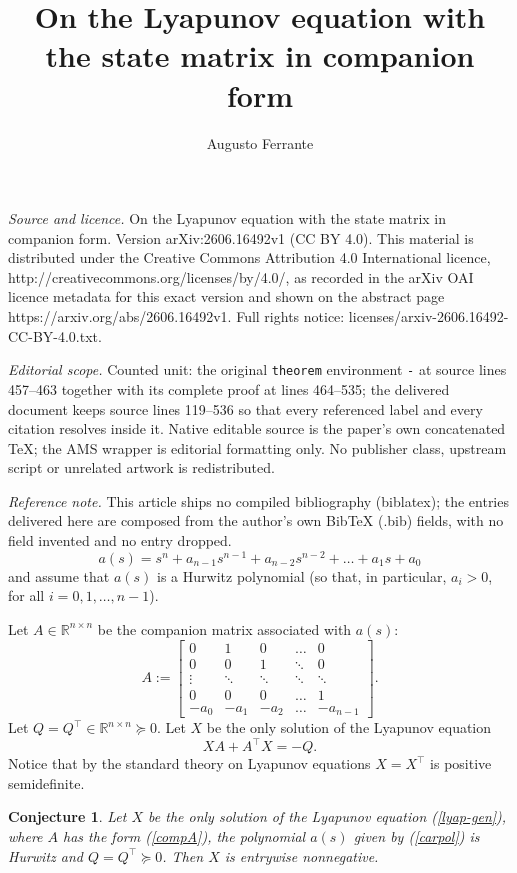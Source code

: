 \documentclass[10pt,a4paper]{amsart}
\def\R{\mathbb{R}}
\newcommand{\tp}{^{\top}}
\newcommand{\beq}{\begin{equation}}
\newcommand{\eeq}{\end{equation}}
\def\bmat{\left[ \begin{array}}
\def\emat{\end{array} \right]}
\newtheorem{conjecture}{Conjecture}[section]
\begin{document}
\title[On the Lyapunov equation with the state matrix in companion ]{On the Lyapunov equation with the state matrix in companion form}
\author{Augusto Ferrante}
\date{}
\maketitle
\noindent\emph{Source and licence.} On the Lyapunov equation with the state matrix in companion form. Version arXiv:2606.16492v1 (CC BY 4.0). This material is distributed under the Creative Commons Attribution 4.0 International licence, http://creativecommons.org/licenses/by/4.0/, as recorded in the arXiv OAI licence metadata for this exact version and shown on the abstract page https://arxiv.org/abs/2606.16492v1. Full rights notice: licenses/arxiv-2606.16492-CC-BY-4.0.txt.\par\smallskip
\noindent\textit{Editorial scope.} Counted unit: the original \texttt{theorem} environment \texttt{-} at source lines 457--463 together with its complete proof at lines 464--535; the delivered document keeps source lines 119--536 so that every referenced label and every citation resolves inside it. Native editable source is the paper's own concatenated TeX; the AMS wrapper is editorial formatting only. No publisher class, upstream script or unrelated artwork is redistributed.
\par\smallskip\noindent\textit{Reference note.} This article ships no compiled bibliography (biblatex); the entries delivered here are composed from the author's own BibTeX (.bib) fields, with no field invented and no entry dropped.
\beq\label{carpol}
a(s)=s^n+a_{n-1}s^{n-1}+a_{n-2}s^{n-2}+\dots+ a_{1}s+a_0
\eeq
and assume that $a(s)$ is a Hurwitz polynomial (so that, in particular,
$a_i>0$, for all $i=0,1,\dots, n-1$).

Let 
$A\in\R^{n\times n}$ be the companion matrix associated with $a(s)$:
\beq\label{compA}
A:=\bmat{cccccc}
0&1 &0 &\dots &0\\
0&0 &1 &\ddots &0\\
\vdots&\ddots&\ddots&\ddots&\ddots\\
0&0&0&\dots&1\\
-a_0&-a_1&-a_2&\dots&-a_{n-1}
\emat.
\eeq
Let $Q=Q\tp\in\R^{n\times n}\succeq 0.$
Let $X$ be the only solution of the Lyapunov equation
\beq\label{lyap-gen}
XA+A\tp X=-Q.
\eeq
Notice that by the standard theory on Lyapunov equations $X=X\tp$ is positive semidefinite.


\begin{conjecture}\label{conj}
Let $X$ be the only solution of the Lyapunov equation (\ref{lyap-gen}), where $A$ has the form 
(\ref{compA}), the polynomial $a(s)$ given by (\ref{carpol}) is Hurwitz and $Q=Q\tp\succeq  0$.
Then $X$ is entrywise nonnegative.
\end{conjecture}
\end{document}

